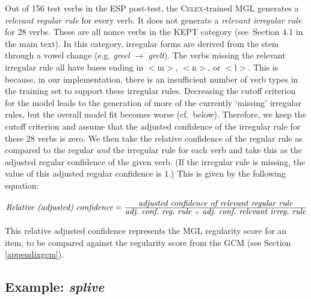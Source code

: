 \documentclass[12pt]{article}
\begin{document}
Out of 156 test verbs in the ESP post-test, the \textsc{Celex}-trained MGL generates a {\em relevant regular rule} for every verb. It does not generate a {\em relevant irregular rule} for 28 verbs. These are all nonce verbs in the \textsc{KEPT} category (see\ Section 4.1 in the main text). In this category, irregular forms are derived from the stem through a vowel change (e.g. {\em greel} $\rightarrow{}$ {\em grelt}). The verbs missing the relevant irregular rule all have bases ending in $<$m$>$, $<$n$>$, or $<$l$>$. This is because, in our implementation, there is an insufficient number of verb types in the training set to support these irregular rules. Decreasing the cutoff criterion for the model leads to the generation of more of the currently `missing' irregular rules, but the overall model fit becomes worse (cf.\ below). Therefore, we keep the cutoff criterion and assume that the adjusted confidence of the irregular rule for these 28 verbs is zero. We then take the relative confidence of the regular rule as compared to the regular {\em and} the irregular rule for each verb and take this as the adjusted regular confidence of the given verb. (If the irregular rule is missing, the value of this adjusted regular confidence is 1.) This is given by the following equation:

\vspace{1cm}
$\mbox{\it Relative (adjusted) confidence} = \frac{\mbox{\it  adjusted confidence of relevant regular rule}} {\mbox{\it  adj.\ conf.\ reg.\ rule } + \mbox{ \it adj.\ conf.\ relevant irreg.\ rule}}$
\vspace{1cm}

This relative adjusted confidence represents the MGL regularity score for an item, to be compared against the regularity score from the GCM (see Section \ref{appendixgcm}).  

\subsection{Example: {\em splive}}
\end{document}

